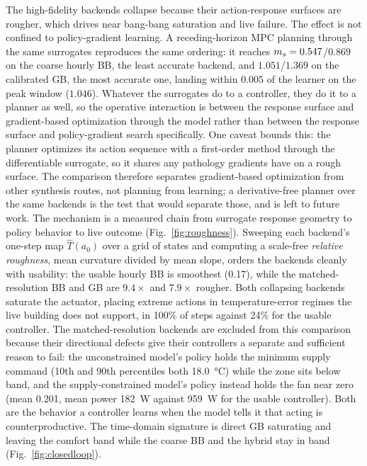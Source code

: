 The high-fidelity backends collapse because their action-response surfaces are rougher, which drives
near bang-bang saturation and live failure. The effect is not confined to policy-gradient learning.
A receding-horizon MPC planning through the same surrogates reproduces the same ordering: it reaches
$m_s=0.547$/$0.869$ on the coarse hourly BB, the least accurate backend, and $1.051$/$1.369$ on the
calibrated GB, the most accurate one, landing within $0.005$ of the learner on the peak window
($1.046$). Whatever the surrogates do to a controller, they do it to a planner as well, so the
operative interaction is between the response surface and gradient-based optimization through the
model rather than between the response surface and policy-gradient search specifically. One caveat
bounds this: the planner optimizes its action sequence with a first-order method through the
differentiable surrogate, so it shares any pathology gradients have on a rough surface. The
comparison therefore separates gradient-based optimization from other synthesis routes, not planning
from learning; a derivative-free planner over the same backends is the test that would separate
those, and is left to future work. The mechanism is a measured chain from surrogate
response geometry to policy behavior to live outcome (Fig.~\ref{fig:roughness}). Sweeping each
backend's one-step map $\widehat{T}(a_0)$ over a grid of states and computing a scale-free
\emph{relative roughness}, mean curvature divided by mean slope, orders the backends cleanly with
usability: the usable hourly BB is smoothest (0.17), while the matched-resolution BB and GB are
$9.4\times$ and $7.9\times$ rougher. Both collapsing backends saturate the actuator, placing extreme
actions in temperature-error regimes the live building does not support, in 100\% of steps against
24\% for the usable controller. The matched-resolution backends are excluded from this comparison because their
directional defects give their controllers a separate and sufficient reason to fail: the
unconstrained model's policy holds the minimum supply command (10th and 90th percentiles both
\SI{18.0}{\celsius}) while the zone sits below band, and the supply-constrained model's policy
instead holds the fan near zero (mean \num{0.201}, mean power \SI{182}{\watt} against
\SI{959}{\watt} for the usable controller). Both are the behavior a controller learns when the
model tells it that acting is counterproductive. The time-domain signature is direct GB saturating and leaving the
comfort band while the coarse BB and the hybrid stay in band (Fig.~\ref{fig:closedloop}).

